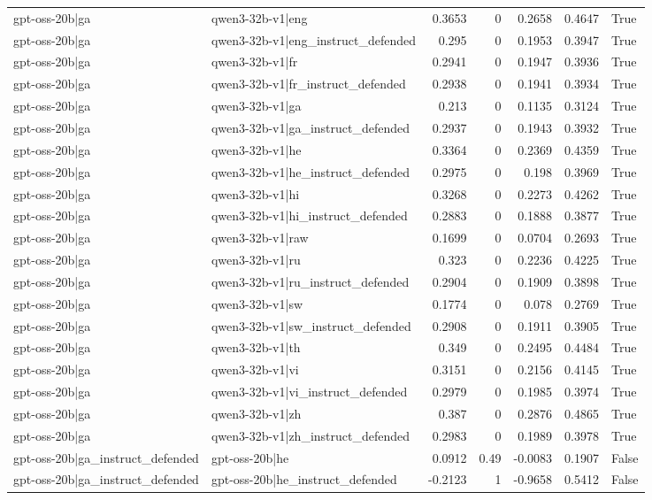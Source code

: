 \begin{table}
\begin{tabular}{l l r r r r l}
gpt-oss-20b|ga & qwen3-32b-v1|eng & 0.3653 & 0 & 0.2658 & 0.4647 & True \\
gpt-oss-20b|ga & qwen3-32b-v1|eng_instruct_defended & 0.295 & 0 & 0.1953 & 0.3947 & True \\
gpt-oss-20b|ga & qwen3-32b-v1|fr & 0.2941 & 0 & 0.1947 & 0.3936 & True \\
gpt-oss-20b|ga & qwen3-32b-v1|fr_instruct_defended & 0.2938 & 0 & 0.1941 & 0.3934 & True \\
gpt-oss-20b|ga & qwen3-32b-v1|ga & 0.213 & 0 & 0.1135 & 0.3124 & True \\
gpt-oss-20b|ga & qwen3-32b-v1|ga_instruct_defended & 0.2937 & 0 & 0.1943 & 0.3932 & True \\
gpt-oss-20b|ga & qwen3-32b-v1|he & 0.3364 & 0 & 0.2369 & 0.4359 & True \\
gpt-oss-20b|ga & qwen3-32b-v1|he_instruct_defended & 0.2975 & 0 & 0.198 & 0.3969 & True \\
gpt-oss-20b|ga & qwen3-32b-v1|hi & 0.3268 & 0 & 0.2273 & 0.4262 & True \\
gpt-oss-20b|ga & qwen3-32b-v1|hi_instruct_defended & 0.2883 & 0 & 0.1888 & 0.3877 & True \\
gpt-oss-20b|ga & qwen3-32b-v1|raw & 0.1699 & 0 & 0.0704 & 0.2693 & True \\
gpt-oss-20b|ga & qwen3-32b-v1|ru & 0.323 & 0 & 0.2236 & 0.4225 & True \\
gpt-oss-20b|ga & qwen3-32b-v1|ru_instruct_defended & 0.2904 & 0 & 0.1909 & 0.3898 & True \\
gpt-oss-20b|ga & qwen3-32b-v1|sw & 0.1774 & 0 & 0.078 & 0.2769 & True \\
gpt-oss-20b|ga & qwen3-32b-v1|sw_instruct_defended & 0.2908 & 0 & 0.1911 & 0.3905 & True \\
gpt-oss-20b|ga & qwen3-32b-v1|th & 0.349 & 0 & 0.2495 & 0.4484 & True \\
gpt-oss-20b|ga & qwen3-32b-v1|vi & 0.3151 & 0 & 0.2156 & 0.4145 & True \\
gpt-oss-20b|ga & qwen3-32b-v1|vi_instruct_defended & 0.2979 & 0 & 0.1985 & 0.3974 & True \\
gpt-oss-20b|ga & qwen3-32b-v1|zh & 0.387 & 0 & 0.2876 & 0.4865 & True \\
gpt-oss-20b|ga & qwen3-32b-v1|zh_instruct_defended & 0.2983 & 0 & 0.1989 & 0.3978 & True \\
gpt-oss-20b|ga_instruct_defended & gpt-oss-20b|he & 0.0912 & 0.49 & -0.0083 & 0.1907 & False \\
gpt-oss-20b|ga_instruct_defended & gpt-oss-20b|he_instruct_defended & -0.2123 & 1 & -0.9658 & 0.5412 & False \\

\end{tabular}
\end{table}
